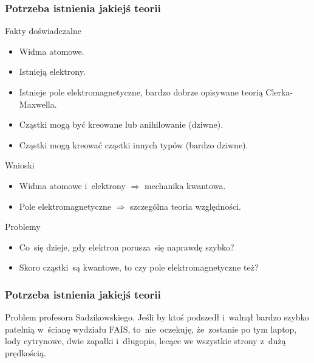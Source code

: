 \documentclass[10pt,t]{beamer}
\begin{document}
\begin{frame}
  \frametitle{Potrzeba istnienia jakiejś teorii}


  Fakty doświadczalne
  \begin{itemize}
    \RaggedRight

  \item Widma atomowe.

  \item Istnieją elektrony.

  \item Istnieje pole elektromagnetyczne, bardzo dobrze
    opisywane teorią Clerka-Maxwella.

  \item Cząstki mogą być kreowane lub anihilowanie (dziwne).

  \item Cząstki mogą kreować cząstki innych typów (bardzo
    dziwne).

  \end{itemize}

  Wnioski
  \begin{itemize}
    \RaggedRight

  \item Widma atomowe i~elektrony $\Rightarrow$ mechanika kwantowa.

  \item Pole elektromagnetyczne $\Rightarrow$ szczególna teoria względności.

  \end{itemize}



  Problemy
  \begin{itemize}
    \RaggedRight

  \item Co~się dzieje, gdy elektron porusza~się naprawdę szybko?

  \item Skoro cząstki~są kwantowe, to czy pole elektromagnetyczne też?

  \end{itemize}

\end{frame}





\begin{frame}
  \frametitle{Potrzeba istnienia jakiejś teorii}


  Problem profesora Sadzikowskiego.
  Jeśli by ktoś podszedł i~walnął bardzo szybko patelnią w~ścianę
  wydziału FAIS, to~nie~oczekuję, że~zostanie po tym laptop, lody
  cytrynowe, dwie zapałki i~długopis, lecące we wszystkie strony z~dużą
  prędkością.

\end{frame}
\end{document}
